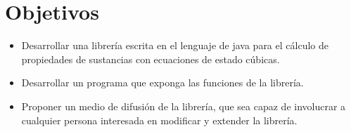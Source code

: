 \chapter{Objetivos}

\begin{itemize}
	\item Desarrollar una librería escrita en el lenguaje de java para el cálculo de propiedades de sustancias con ecuaciones de estado cúbicas.
	\item Desarrollar un programa que exponga las funciones de la librería.
	\item Proponer un medio de difusión de la librería, que sea capaz de involucrar a cualquier persona interesada en modificar y extender la librería.
\end{itemize}
